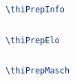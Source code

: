 \documentclass[aspectratio=169]{beamer}
\begin{document}
\thiDefaults
\thiPrepInfo
\subsection{\thifak}
\def \thititleB {\thifak}
\maketitle

\begin{frame}[fragile]
    \frametitle{\thifak}
    \begin{lstlisting}[language=TeX]
        \thiPrepInfo
    \end{lstlisting}
\end{frame}

\thiDefaults
\thiPrepElo
\subsection{\thifak}
\def \thititleB {\thifak}
\maketitle

\begin{frame}[fragile]
    \frametitle{\thifak}
    \begin{lstlisting}[language=TeX]
        \thiPrepElo
    \end{lstlisting}
\end{frame}

\thiDefaults
\thiPrepMasch
\subsection{\thifak}
\def \thititleB {\thifak}
\maketitle

\begin{frame}[fragile]
    \frametitle{\thifak}
    \begin{lstlisting}[language=TeX]
        \thiPrepMasch
    \end{lstlisting}
\end{frame}

\thiDefaults
\thiPrepWirt
\subsection{\thifak}
\def \thititleB {\thifak}
\maketitle
\end{document}
